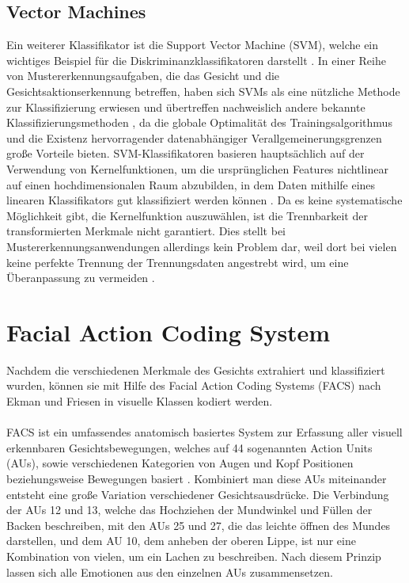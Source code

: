 \documentclass[12pt,a4paper,headinclude,twoside, plainheadsepline, open=right,numbers=noenddot]{scrreprt}
\begin{document}
\subsection{Vector Machines}
Ein weiterer Klassifikator ist die Support Vector Machine (SVM), welche ein wichtiges Beispiel für die Diskriminanzklassifikatoren darstellt \cite{MoatazElAyadi2011SpeechEmotionRecognition}. In einer Reihe von Mustererkennungsaufgaben, die das Gesicht und die Gesichtsaktionserkennung betreffen, haben sich SVMs als eine nützliche Methode zur Klassifizierung erwiesen \cite{Lucey2010CK+} und übertreffen nachweislich andere bekannte Klassifizierungsmethoden \cite{MoatazElAyadi2011SpeechEmotionRecognition}, da die globale Optimalität des Trainingsalgorithmus und die Existenz hervorragender datenabhängiger Verallgemeinerungsgrenzen große Vorteile bieten. SVM-Klassifikatoren basieren hauptsächlich auf der Verwendung von Kernelfunktionen, um die ursprünglichen Features nichtlinear auf einen hochdimensionalen Raum abzubilden, in dem Daten mithilfe eines linearen Klassifikators gut klassifiziert werden können \cite{MoatazElAyadi2011SpeechEmotionRecognition}. Da es keine systematische Möglichkeit gibt, die Kernelfunktion auszuwählen, ist die Trennbarkeit der transformierten Merkmale nicht garantiert. Dies stellt bei Mustererkennungsanwendungen allerdings kein Problem dar, weil dort bei vielen keine perfekte Trennung der Trennungsdaten angestrebt wird, um eine Überanpassung zu vermeiden \cite{MoatazElAyadi2011SpeechEmotionRecognition}.

\section{Facial Action Coding System}
Nachdem die verschiedenen Merkmale des Gesichts extrahiert und klassifiziert wurden, können sie mit Hilfe des Facial Action Coding Systems (FACS) nach Ekman und Friesen in visuelle Klassen kodiert werden.
\paragraph{}
FACS ist ein umfassendes anatomisch basiertes System zur Erfassung aller visuell erkennbaren Gesichtsbewegungen, welches auf 44 sogenannten Action Units (AUs), sowie verschiedenen Kategorien von Augen und Kopf Positionen beziehungsweise Bewegungen basiert \cite{Ekman1997}. Kombiniert man diese AUs miteinander entsteht eine große Variation verschiedener Gesichtsausdrücke. Die Verbindung der AUs 12 und 13, welche das Hochziehen der Mundwinkel und Füllen der Backen beschreiben, mit den AUs 25 und 27, die das leichte öffnen des Mundes darstellen, und dem AU 10, dem anheben der oberen Lippe, ist nur eine Kombination von vielen, um ein Lachen zu beschreiben. Nach diesem Prinzip lassen sich alle Emotionen aus den einzelnen AUs zusammensetzen. 
\end{document}
